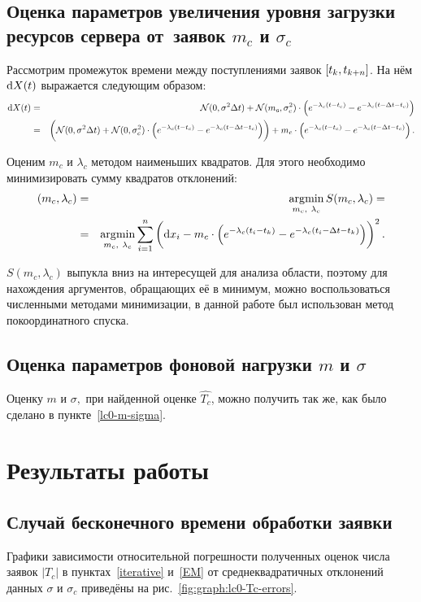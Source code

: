 \documentclass[a4paper,10pt]{article}
\DeclareMathOperator*{\argmin}{\arg\!\min}
\begin{document}
\subsection{Оценка параметров увеличения уровня загрузки ресурсов сервера %
от~заявок $m_c$ и $\sigma_c$}
Рассмотрим промежуток времени между поступлениями заявок $\sbr{t_k, t_{k+n}}$. 
На нём $\dif X(t)$ выражается следующим образом:
\begin{eqnarray*}
\dif X(t) 
  & = & \mathcal{N}(0, \sigma^2 \Delta t) + 
      \mathcal{N}(m_c, \sigma_c^2) \cdot 
        \del{e^{-\lambda_c(t - t_c)} - e^{-\lambda_c(t - \Delta t - t_c)}} \\
  & = & \del{
      \mathcal{N}(0, \sigma^2 \Delta t) + 
      \mathcal{N}(0, \sigma_c^2) \cdot 
        \del{e^{-\lambda_c(t - t_c)} - e^{-\lambda_c(t - \Delta t - t_c)}}} +
      m_c \cdot 
        \del{e^{-\lambda_c(t - t_c)} - e^{-\lambda_c(t - \Delta t - t_c)}}.
\end{eqnarray*}

Оценим $m_c$ и $\lambda_c$ методом наименьших квадратов.
Для этого необходимо минимизировать сумму квадратов отклонений:
\begin{eqnarray*}
\del{m_c, \lambda_c} 
  & = & \argmin\limits_{m_c,\ \lambda_c} S(m_c, \lambda_c) = \\
  & = & \argmin\limits_{m_c,\ \lambda_c} \sum\limits_{i=1}^{n} 
    \del{\dif x_i - m_c \cdot 
      \del{e^{-\lambda_c(t_i - t_k)} - 
           e^{-\lambda_c(t_i - \Delta t - t_k)}}}^2.
\end{eqnarray*}

$S(m_c, \lambda_c)$ выпукла вниз на интересущей для анализа области, 
поэтому для нахождения аргументов, обращающих её в минимум, 
можно воспользоваться численными методами минимизации, в данной работе
был использован метод покоординатного спуска.

\subsection{Оценка параметров фоновой нагрузки $m$ и $\sigma$}
Оценку $m$ и $\sigma,$ при найденной оценке $\widehat{T_c}$, можно 
получить так же, как было сделано в пункте~\ref{lc0-m-sigma}.

\section{Результаты работы}
\subsection{Случай бесконечного времени обработки заявки}
Графики зависимости относительной погрешности полученных оценок числа 
заявок $|T_c|$ в пунктах~\ref{iterative} и~\ref{EM} 
от среднеквадратичных отклонений данных $\sigma$ и $\sigma_c$
приведёны на рис.~\ref{fig:graph:lc0-Tc-errors}.
\end{document}
